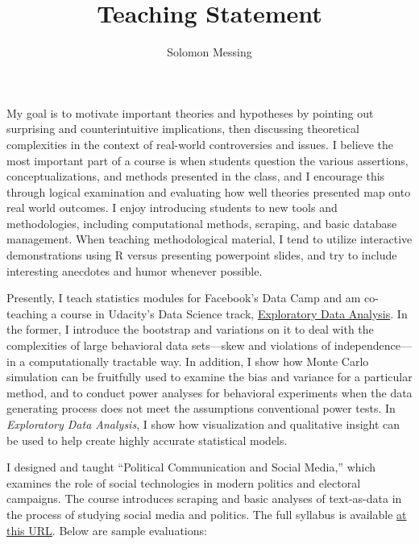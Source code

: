 \documentclass[12pt]{article}
\begin{document}
  
\title{Teaching Statement}
\author{Solomon Messing}

\maketitle 





My goal is to motivate important theories and hypotheses by pointing out surprising and counterintuitive implications, then discussing theoretical complexities in the context of real-world controversies and issues.  I believe the most important part of a course is when students question the various assertions, conceptualizations, and methods presented in the class, and I encourage this through logical examination and evaluating how well theories presented map onto real world outcomes.  I enjoy introducing students to new tools and methodologies, including computational methods, scraping, and basic database management.  When teaching methodological material, I tend to utilize interactive demonstrations using R versus presenting powerpoint slides, and try to include interesting anecdotes and humor whenever possible.  

Presently, I teach statistics modules for Facebook's Data Camp and am co-teaching a course in Udacity's Data Science track, 
\href{https://www.udacity.com/course/ud651}{Exploratory Data Analysis}.  In the former, I introduce the bootstrap and variations on it to deal with the complexities of large behavioral data sets---skew and violations of independence---in a computationally tractable way.  In addition, I show how Monte Carlo simulation can be fruitfully used to examine the bias and variance for a particular method, and to conduct power analyses for behavioral experiments when the data generating process does not meet the assumptions conventional power tests.  In \emph{Exploratory Data Analysis}, I show how visualization and qualitative insight can be used to help create highly accurate statistical models.  

I designed and taught ``Political Communication and Social Media,'' which examines the role of social technologies in modern politics and electoral campaigns.  The course introduces scraping and basic analyses of text-as-data in the process of studying social media and politics.  The full syllabus is available \href{http://dl.dropboxusercontent.com/u/25710348/PoliticalCommunicationSocialMedia/SYLLABUSPoliticalCommunicationSocialMedia.pdf}{at this URL}. Below are sample evaluations: 
\end{document}
